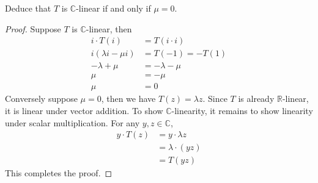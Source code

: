 \documentclass{article}
\theoremstyle{definition}
\numberwithin{lemma}{problem}
\numberwithin{equation}{problem}
\newcommand{\R}{\mathbb{R}}
\newcommand{\C}{\mathbb{C}}
\begin{document}
Deduce that $T$ is $\C$-linear if and only if $\mu = 0$.
\begin{proof}
    Suppose $T$ is $\C$-linear, then
    \begin{align*}
        i\cdot T(i) &= T(i\cdot i) \\
        i(\lambda i - \mu i)  &= T(-1) = - T(1) \\
        -\lambda + \mu  &= -\lambda - \mu \\
        \mu  &= -\mu \\
        \mu  &= 0
    \end{align*}
    Conversely suppose $\mu = 0$, then we have $T(z) = \lambda z$.
    Since $T$ is already $\R$-linear, it is linear under vector addition.
    To show $\C$-linearity, it remains to show linearity under scalar multiplication.
    For any $y,z\in \C$,
    \begin{align*}
        y\cdot T(z) &= y\cdot \lambda z    \\
        &= \lambda \cdot(yz)    \\
        &= T(yz)
    \end{align*}
    This completes the proof.
\end{proof}
\end{document}
